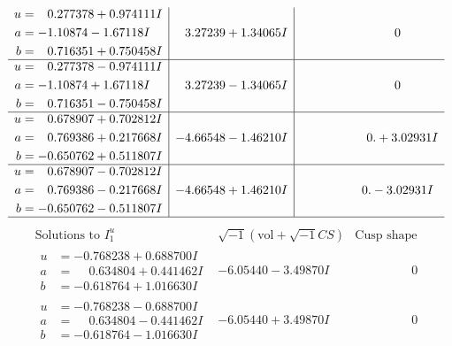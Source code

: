 \documentclass[1p]{elsarticle_modified}
\theoremstyle{definition}
\newcommand{\I}{\sqrt{-1}}
\begin{document}
$$\begin{array}{c|c|c}
\begin{aligned}
u &= \phantom{-}0.277378 + 0.974111 I \\
a &= -1.10874 - 1.67118 I \\
b &= \phantom{-}0.716351 + 0.750458 I\end{aligned}
 & \phantom{-}3.27239 + 1.34065 I & \phantom{-0.000000 } 0 \\ \hline\begin{aligned}
u &= \phantom{-}0.277378 - 0.974111 I \\
a &= -1.10874 + 1.67118 I \\
b &= \phantom{-}0.716351 - 0.750458 I\end{aligned}
 & \phantom{-}3.27239 - 1.34065 I & \phantom{-0.000000 } 0 \\ \hline\begin{aligned}
u &= \phantom{-}0.678907 + 0.702812 I \\
a &= \phantom{-}0.769386 + 0.217668 I \\
b &= -0.650762 + 0.511807 I\end{aligned}
 & -4.66548 - 1.46210 I & \phantom{-0.000000 -}0. + 3.02931 I \\ \hline\begin{aligned}
u &= \phantom{-}0.678907 - 0.702812 I \\
a &= \phantom{-}0.769386 - 0.217668 I \\
b &= -0.650762 - 0.511807 I\end{aligned}
 & -4.66548 + 1.46210 I & \phantom{-0.000000 } 0. - 3.02931 I\\
 \hline 
 \end{array}$$\newpage$$\begin{array}{c|c|c}  
\text{Solutions to }I^u_{1}& \I (\text{vol} + \sqrt{-1}CS) & \text{Cusp shape}\\
 \hline 
\begin{aligned}
u &= -0.768238 + 0.688700 I \\
a &= \phantom{-}0.634804 + 0.441462 I \\
b &= -0.618764 + 1.016630 I\end{aligned}
 & -6.05440 - 3.49870 I & \phantom{-0.000000 } 0 \\ \hline\begin{aligned}
u &= -0.768238 - 0.688700 I \\
a &= \phantom{-}0.634804 - 0.441462 I \\
b &= -0.618764 - 1.016630 I\end{aligned}
 & -6.05440 + 3.49870 I & \phantom{-0.000000 } 0 \\ \hline\begin{aligned}

\end{aligned}
\end{array}$$
\end{document}
